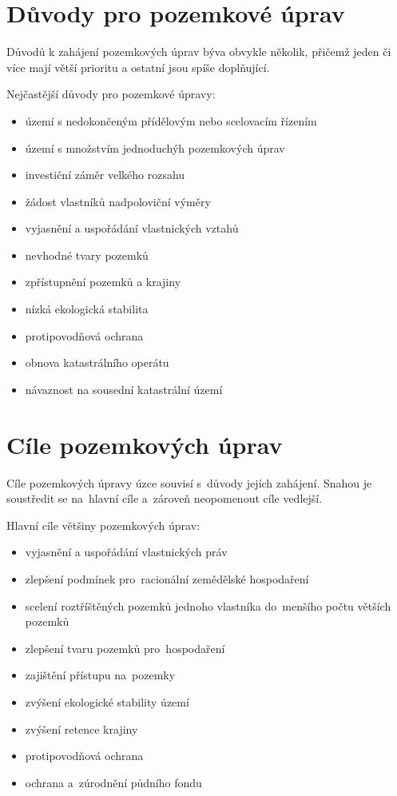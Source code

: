 \section{Důvody pro pozemkové úprav}
\label{duvody_pu}

Důvodů k zahájení pozemkových úprav býva obvykle několik, přičemž jeden či více mají větší prioritu a ostatní jsou spíše doplňující.

Nejčastější důvody pro pozemkové úpravy:
	\begin{itemize}[leftmargin=1.5cm]
		\item území s nedokončeným přídělovým nebo scelovacím řízením
		\item území s množstvím jednoduchýh pozemkových úprav
		\item investiční záměr velkého rozsahu
		\item žádost vlastníků nadpoloviční výměry
		\item vyjasnění a uspořádání vlastnických vztahů
		\item nevhodné tvary pozemků
		\item zpřístupnění pozemků a krajiny
		\item nízká ekologická stabilita
		\item protipovodňová ochrana
		\item obnova katastrálního operátu
		\item návaznost na sousední katastrální území
	\end{itemize}

\section{Cíle pozemkových úprav}
\label{cile_pu}

Cíle pozemkových úpravy úzce souvisí s~důvody jejích zahájení. Snahou je soustředit se na~hlavní cíle a~zároveň neopomenout cíle vedlejší.

Hlavní cíle většiny pozemkových úprav:
	\begin{itemize}[leftmargin=1.5cm]
		\item vyjasnění a uspořádání vlastnických práv
		\item zlepšení podmínek pro~racionální zemědělské hospodaření
		\item scelení roztříštěných pozemků jednoho vlastníka do~menšího počtu větších pozemků
		\item zlepšení tvaru pozemků pro~hospodaření
		\item zajištění přístupu na~pozemky
		\item zvýšení ekologické stability území
		\item zvýšení retence krajiny
		\item protipovodňová ochrana
		\item ochrana a~zúrodnění půdního fondu
	\end{itemize}

